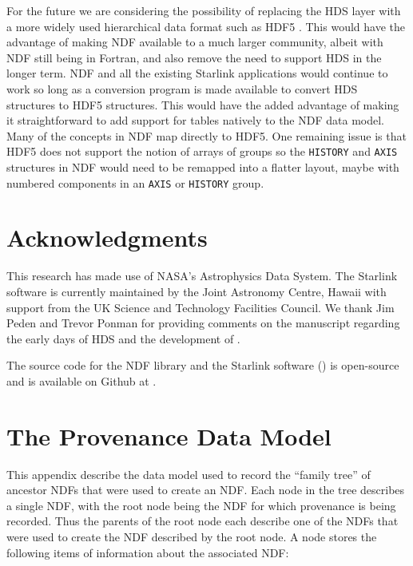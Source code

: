 \documentclass[final,authoryear,5p,times,twocolumn]{elsarticle}
\begin{document}
For the future we are considering the possibility of replacing the HDS
layer with a more widely used hierarchical data format such as HDF5
\citep{Folk:2011:OHT:1966895.1966900}. This would have the advantage
of making NDF available to a much larger community, albeit with NDF
still being in Fortran, and also remove the
need to support HDS in the longer term. NDF and all the existing
Starlink applications would continue to work so long as a conversion
program is made available to convert HDS structures to HDF5 structures.
This would have the added advantage of making it straightforward to
add support for tables natively to the NDF data model. Many of the
concepts in NDF map directly to HDF5. One remaining issue is that HDF5
does not support the notion of arrays of groups so the
\texttt{HISTORY} and \texttt{AXIS} structures in NDF would need to be
remapped into a flatter layout, maybe with numbered components in an
\texttt{AXIS} or \texttt{HISTORY} group.

\section{Acknowledgments}

This research has made use of NASA's Astrophysics Data System.
The Starlink software is currently maintained by the Joint Astronomy
Centre, Hawaii with support from the UK Science and Technology
Facilities Council. We thank Jim Peden and Trevor Ponman for providing
comments on the manuscript regarding the early days of HDS and the
development of \asterix.

The source code for the NDF library and the Starlink software
() is open-source and is available on Github at
.


\appendix

\section{The Provenance Data Model}
\label{app:prov}
This appendix describe the data model used to record the ``family tree'' of
ancestor NDFs that were used to create an NDF. Each node in the tree
describes a single NDF, with the root node being the NDF for which
provenance is being recorded. Thus the parents of the root node each
describe one of the NDFs that were used to create the NDF described by the
root node. A node stores the following items of information about the
associated NDF:
\end{document}
